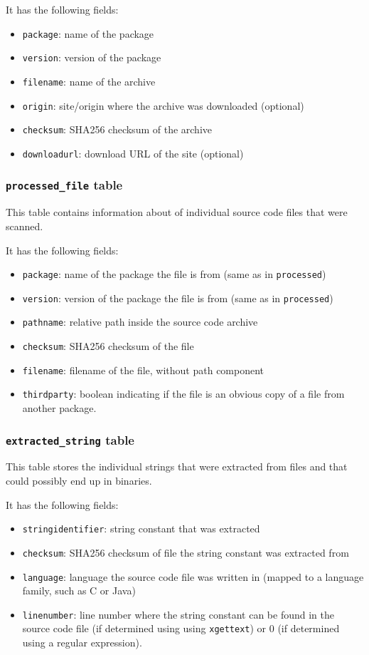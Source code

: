 \documentclass[10pt,a4paper]{article}
\begin{document}
It has the following fields:

\begin{itemize}
\item \texttt{package}: name of the package
\item \texttt{version}: version of the package
\item \texttt{filename}: name of the archive
\item \texttt{origin}: site/origin where the archive was downloaded (optional)
\item \texttt{checksum}: SHA256 checksum of the archive
\item \texttt{downloadurl}: download URL of the site (optional)
\end{itemize}

\subsubsection{\texttt{processed\_file} table}
This table contains information about of individual source code files that were
scanned.

It has the following fields:

\begin{itemize}
\item \texttt{package}: name of the package the file is from (same as in
\texttt{processed})
\item \texttt{version}: version of the package the file is from (same as in
\texttt{processed})
\item \texttt{pathname}: relative path inside the source code archive
\item \texttt{checksum}: SHA256 checksum of the file
\item \texttt{filename}: filename of the file, without path component
\item \texttt{thirdparty}: boolean
indicating if the file is an obvious copy of a file from another package.
\end{itemize}

\subsubsection{\texttt{extracted\_string} table}
This table stores the individual strings that were extracted from files and
that could possibly end up in binaries.

It has the following fields:

\begin{itemize}
\item \texttt{stringidentifier}: string constant that was extracted
\item \texttt{checksum}: SHA256 checksum of file the string constant was
extracted from
\item \texttt{language}: language the source code file was written in (mapped
to a language family, such as C or Java)
\item \texttt{linenumber}: line number where the string constant can be found
in the source code file (if determined using using \texttt{xgettext}) or $0$
(if determined using a regular expression).
\end{itemize}
\end{document}
